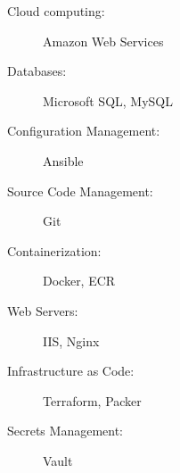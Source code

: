 
\begin{minipage}[t]{.5\linewidth}
  \begin{description}
    \item[Cloud computing:] Amazon Web Services
  \end{description}
\end{minipage}%
\hfil
\begin{minipage}[t]{.5\linewidth}
  \begin{description}
    \item[Databases:] Microsoft SQL, MySQL
  \end{description}
\end{minipage}

\begin{minipage}[t]{.5\linewidth}
  \begin{description}
    \item[Configuration Management:] Ansible
  \end{description}
\end{minipage}%
\hfil
\begin{minipage}[t]{.5\linewidth}
  \begin{description}
    \item[Source Code Management:] Git
  \end{description}
\end{minipage}

\begin{minipage}[t]{.5\linewidth}
  \begin{description}
    \item[Containerization:] Docker, ECR
  \end{description}
\end{minipage}%
\hfil
\begin{minipage}[t]{.5\linewidth}
  \begin{description}
    \item[Web Servers:] IIS, Nginx
  \end{description}
\end{minipage}


\begin{minipage}[t]{.5\linewidth}
  \begin{description}
    \item[Infrastructure as Code:] Terraform, Packer
  \end{description}
\end{minipage}%
\hfil
\begin{minipage}[t]{.5\linewidth}
  \begin{description}
    \item[Secrets Management:] Vault
  \end{description}
\end{minipage}


